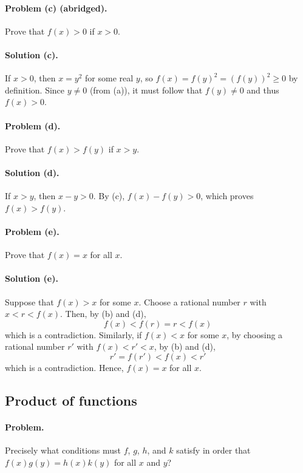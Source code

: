 \documentclass{article}
\begin{document}
\paragraph{Problem (c) (abridged).} Prove that $f(x) > 0$ if $x > 0$.

\paragraph{Solution (c).} If $x > 0$, then $x = y^2$ for some real $y$, so
$f(x) = f(y)^2 = (f(y))^2 \geq 0$ by definition. Since $y \neq 0$ (from (a)),
it must follow that $f(y) \neq 0$ and thus $f(x) > 0$.

\paragraph{Problem (d).} Prove that $f(x) > f(y)$ if $x > y$.

\paragraph{Solution (d).} If $x > y$, then $x - y > 0$. By (c), $f(x) - f(y) >
0$, which proves $f(x) > f(y)$.

\paragraph{Problem (e).} Prove that $f(x) = x$ for all $x$.

\paragraph{Solution (e).} Suppose that $f(x) > x$ for some $x$. Choose a
rational number $r$ with $x < r < f(x)$. Then, by (b) and (d),
\begin{equation*}
  f(x) < f(r) = r < f(x)
\end{equation*} which is a contradiction. Similarly, if $f(x) < x$ for some
$x$, by choosing a rational number $r'$ with $f(x) < r' < x$, by (b) and (d),
\begin{equation*}
  r' = f(r') < f(x) < r'
\end{equation*} which is a contradiction. Hence, $f(x) = x$ for all $x$.

\setcounter{subsection}{17}
\subsection{Product of functions}

\paragraph{Problem.} Precisely what conditions must $f$, $g$, $h$, and $k$
satisfy in order that $f(x)g(y) = h(x)k(y)$ for all $x$ and $y$?
\end{document}
